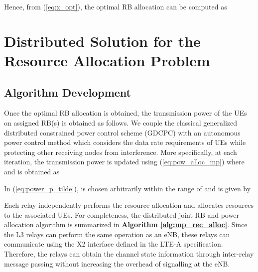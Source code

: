 \documentclass[twocolumn,10pt]{IEEEtran}
\begin{document}
Hence, from (\ref{eq:x_opt}), the optimal RB allocation can be computed as


\section{Distributed Solution for the Resource Allocation Problem} \label{sec:distributed_sol}

\subsection{Algorithm Development}

Once the optimal RB allocation is obtained, the transmission power of the UEs on assigned RB(s) is obtained as follows. We couple the classical generalized distributed constrained power control scheme (GDCPC) \cite{power_gdpc} with an autonomous power control method \cite{auto_pow_cr} which considers the data rate requirements of UEs while protecting other receiving nodes from interference. More specifically, at each iteration, the transmission power is updated using  (\ref{eq:pow_alloc_mp}) where  and  is obtained as 


\begin{figure*}[!t]
\normalsize



\hrulefill
\vspace*{4pt}
\end{figure*}


In (\ref{eq:power_p_tilde}),  is chosen arbitrarily within the range of  and  is given by


 Each relay independently performs the resource allocation and allocates
resources to the associated UEs. For completeness, the distributed joint RB and power allocation algorithm is summarized in \textbf{Algorithm \ref{alg:mp_rec_alloc}}. Since the L3 relays can perform the same operation as an eNB, these relays can communicate using the X2 interface
\cite{lte_arch} defined in the LTE-A specification. Therefore, the relays can obtain the channel state information through inter-relay message passing without increasing the overhead of signalling at the eNB.
\end{document}
